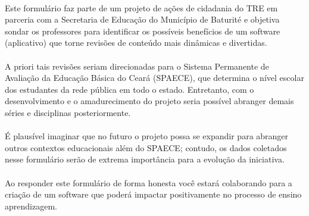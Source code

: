 \paragraph{} Este formulário faz parte de um projeto de ações de cidadania do TRE em parceria com a Secretaria de Educação do Município de Baturité e objetiva sondar os professores para identificar os possíveis benefícios de um software (aplicativo) que torne revisões de conteúdo mais dinâmicas e divertidas.

\paragraph{} A priori tais revisões seriam direcionadas para o Sistema Permanente de Avaliação da Educação Básica do Ceará (SPAECE), que determina o nível escolar dos estudantes da rede pública em todo o estado. Entretanto, com o desenvolvimento e o amadurecimento do projeto seria possível abranger demais séries e disciplinas posteriormente.

\paragraph{} É plausível imaginar que no futuro o projeto possa se expandir para abranger outros contextos educacionais além do SPAECE; contudo, os dados coletados nesse formulário serão de extrema importância para a evolução da iniciativa. 
    
\paragraph{} Ao responder este formulário de forma honesta você estará colaborando para a criação de um software que poderá impactar positivamente no processo de ensino aprendizagem.